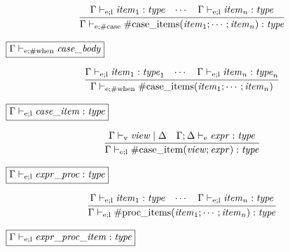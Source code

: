 \begin{gather*}
    \infer{\Gamma \vdash_{\mathrm{e}; \mathrm{\#case}} \mathrm{\#case\_items}(\mathit{item}_1; \cdots; \mathit{item}_n): \mathit{type}}{
        \Gamma \vdash_{\mathrm{e}; \mathrm{l}} \mathit{item}_1: \mathit{type}
        &
        \cdots
        &
        \Gamma \vdash_{\mathrm{e}; \mathrm{l}} \mathit{item}_n: \mathit{type}
    }
\end{gather*}

$\fbox{$\Gamma \vdash_{\mathrm{e}; \mathrm{\#when}} \mathit{case\_body}$}$

\begin{gather*}
    \infer{\Gamma \vdash_{\mathrm{e}; \mathrm{\#when}} \mathrm{\#case\_items}(\mathit{item}_1; \cdots; \mathit{item}_n)}{
        \Gamma \vdash_{\mathrm{e}; \mathrm{l}} \mathit{item}_1: \mathit{type}_1
        &
        \cdots
        &
        \Gamma \vdash_{\mathrm{e}; \mathrm{l}} \mathit{item}_n: \mathit{type}_n
    }
\end{gather*}

$\fbox{$\Gamma \vdash_{\mathrm{e}; \mathrm{l}} \mathit{case\_item}: \mathit{type}$}$

\begin{gather*}
    \infer{\Gamma \vdash_{\mathrm{e}; \mathrm{l}} \mathrm{\#case\_item}(\mathit{view}; \mathit{expr}): \mathit{type}}{
        \Gamma \vdash_\mathrm{v} \mathit{view} \mid \Delta
        &
        \Gamma; \Delta \vdash_\mathrm{e} \mathit{expr}: \mathit{type}
    }
\end{gather*}

$\fbox{$\Gamma \vdash_{\mathrm{e}; \mathrm{l}} \mathit{expr\_proc}: \mathit{type}$}$

\begin{gather*}
    \infer{\Gamma \vdash_{\mathrm{e}; \mathrm{l}} \mathrm{\#proc\_items}(\mathit{item}_1; \cdots; \mathit{item}_n): \mathit{type}}{
        \Gamma \vdash_{\mathrm{e}; \mathrm{l}} \mathit{item}_1: \mathit{type}
        &
        \cdots
        &
        \Gamma \vdash_{\mathrm{e}; \mathrm{l}} \mathit{item}_n: \mathit{type}
    }
\end{gather*}

$\fbox{$\Gamma \vdash_{\mathrm{e}; \mathrm{l}} \mathit{expr\_proc\_item}: \mathit{type}$}$

